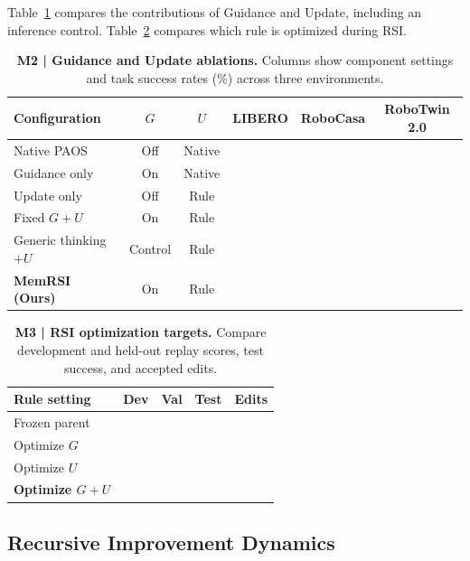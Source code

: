 Table~\ref{tab:M2_gu_ablation} compares the contributions
of Guidance and Update, including an inference control.
Table~\ref{tab:M3_rsi_target_ablation} compares
which rule is optimized during RSI.

\begin{table}[t]
\centering
\caption{\textbf{M2 | Guidance and Update ablations.}
Columns show component settings and task success rates
(\%) across three environments.}
\label{tab:M2_gu_ablation}
\small
\setlength{\tabcolsep}{10pt}
\renewcommand{\arraystretch}{1.18}
\begin{tabular}{@{}lccccc@{}}
\toprule
\rowcolor{cvprblue!8}
\textbf{Configuration}
& \textbf{$G$}
& \textbf{$U$}
& \textbf{LIBERO}
& \textbf{RoboCasa}
& \textbf{RoboTwin 2.0} \\
\midrule
Native PAOS & Off & Native & & & \\
Guidance only & On & Native & & & \\
Update only & Off & Rule & & & \\
Fixed $G+U$ & On & Rule & & & \\
Generic thinking $+U$ & Control & Rule & & & \\
\midrule
\rowcolor{red!5}
\textbf{MemRSI (Ours)} & On & Rule & & & \\
\bottomrule
\end{tabular}
\end{table}

\begin{table}[t]
\centering
\caption{\textbf{M3 | RSI optimization targets.}
Compare development and held-out replay scores,
test success, and accepted edits.}
\label{tab:M3_rsi_target_ablation}
\small
\setlength{\tabcolsep}{5pt}
\renewcommand{\arraystretch}{1.18}
\begin{tabular}{@{}lcccc@{}}
\toprule
\rowcolor{cvprblue!8}
\textbf{Rule setting}
& \textbf{Dev}
& \textbf{Val}
& \textbf{Test}
& \textbf{Edits} \\
\midrule
Frozen parent & & & & \\
Optimize $G$ & & & & \\
Optimize $U$ & & & & \\
\midrule
\rowcolor{red!5}
\textbf{Optimize $G+U$} & & & & \\
\bottomrule
\end{tabular}
\end{table}

\subsection{Recursive Improvement Dynamics}

